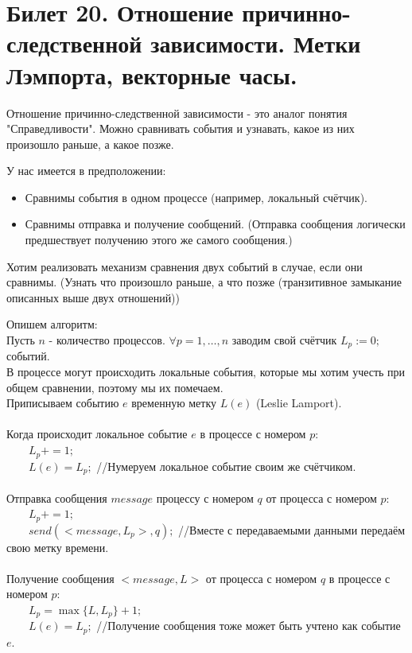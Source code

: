 \newpage
\section {Билет 20. Отношение причинно-следственной зависимости. Метки Лэмпорта, векторные часы.}
Отношение причинно-следственной зависимости - это аналог понятия "Справедливости". Можно сравнивать события и узнавать, какое из них произошло раньше, а какое позже.

У нас имеется в предположении:
\begin{itemize}
\item Сравнимы события в одном процессе (например, локальный счётчик).
\item Сравнимы отправка и получение сообщений. (Отправка сообщения логически предшествует получению этого же самого сообщения.)
\end{itemize}
Хотим реализовать механизм сравнения двух событий в случае, если они сравнимы. (Узнать что произошло раньше, а что позже (транзитивное замыкание описанных выше двух отношений))

Опишем алгоритм:\\
Пусть $n$ - количество процессов. $\forall p = 1, \ldots, n$ заводим свой счётчик $L_p := 0;$ событий.\\
В процессе могут происходить локальные события, которые мы хотим учесть при общем сравнении, поэтому мы их помечаем.\\
Приписываем событию $e$ временную метку $L(e)$ (Leslie Lamport).\\ \\
Когда происходит локальное событие $e$ в процессе с номером $p$:\\
\ \ \ \ $L_p += 1;$\\
\ \ \ \ $L(e) = L_p;$ //Нумеруем локальное событие своим же счётчиком. \\ \\ 
Отправка сообщения $message$ процессу с номером $q$ от процесса с номером $p$:\\
\ \ \ \ $L_p += 1;$\\
\ \ \ \ $send(<message, L_p>, q);$ //Вместе с передаваемыми данными передаём свою метку времени.\\ \\
Получение сообщения $<message, L>$ от процесса с номером $q$ в  процессе с номером $p$:\\ 
\ \ \ \ $L_p = \max\{L,L_p\} + 1;$\\
\ \ \ \ $L(e) = L_p;$ //Получение сообщения тоже может быть учтено как событие $e$. \\

